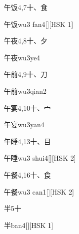 \begin{Entry}{午饭}{4,7}{⼗、⾷}
  \begin{Phonetics}{午饭}{wu3 fan4}[][HSK 1]
  \end{Phonetics}
\end{Entry}

\begin{Entry}{午夜}{4,8}{⼗、⼣}
  \begin{Phonetics}{午夜}{wu3ye4}
  \end{Phonetics}
\end{Entry}

\begin{Entry}{午前}{4,9}{⼗、⼑}
  \begin{Phonetics}{午前}{wu3qian2}
  \end{Phonetics}
\end{Entry}

\begin{Entry}{午宴}{4,10}{⼗、⼧}
  \begin{Phonetics}{午宴}{wu3yan4}
  \end{Phonetics}
\end{Entry}

\begin{Entry}{午睡}{4,13}{⼗、⽬}
  \begin{Phonetics}{午睡}{wu3 shui4}[][HSK 2]
  \end{Phonetics}
\end{Entry}

\begin{Entry}{午餐}{4,16}{⼗、⾷}
  \begin{Phonetics}{午餐}{wu3 can1}[][HSK 2]
  \end{Phonetics}
\end{Entry}

\begin{Entry}{半}{5}{⼗}
  \begin{Phonetics}{半}{ban4}[][HSK 1]
  \end{Phonetics}
\end{Entry}

